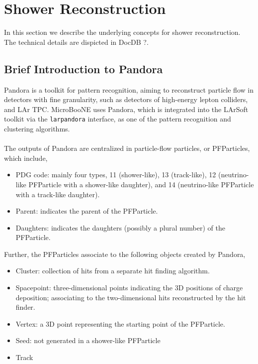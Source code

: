 \section{Shower Reconstruction}
\label{sec:reco}

In this section we describe the underlying concepts for shower reconstruction.
The technical details are dispicted in DocDB ?.

\subsection{Brief Introduction to Pandora}
\label{sec:pandora}

Pandora is a toolkit for pattern recognition, aiming to 
reconstruct particle flow in detectors with fine granularity, such as
detectors of high-energy lepton colliders, and LAr TPC.
MicroBooNE uses Pandora, which is integrated into the LArSoft toolkit
via the \texttt{larpandora} interface,
as one of the pattern recognition and clustering algorithms. \\
\\
The outputs of Pandora are centralized in particle-flow particles, 
or PFParticles, which include,
\begin{itemize}
\item PDG code: mainly four types, 11 (shower-like),
      13 (track-like), 12 (neutrino-like PFParticle with a shower-like
      daughter), and 14 (neutrino-like PFParticle with a track-like daughter).
\item Parent: indicates the parent of the PFParticle.
\item Daughters: indicates the daughters (possibly a plural number) of
      the PFParticle.
\end{itemize}
Further, the PFParticles associate to the following objects created
by Pandora,
\begin{itemize}
\item Cluster: collection of hits from a separate hit finding algorithm.
\item Spacepoint: three-dimensional points indicating the 3D positions
      of charge deposition; associating to the two-dimensional hits
      reconstructed by the hit finder.
\item Vertex: a 3D point representing the starting point of the PFParticle.
\item Seed: not generated in a shower-like PFParticle
\item Track
\end{itemize}

